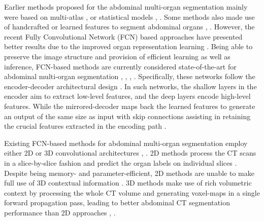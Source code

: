 \documentclass[final,5p,times,twocolumn]{elsarticle}
\begin{document}
Earlier methods proposed for the abdominal multi-organ segmentation mainly were based on multi-atlas \cite{xu2015efficient}, \cite{suzuki2012multi} or statistical models \cite{cerrolaza2015automatic}, \cite{okada2015abdominal}. Some methods also made use of handcrafted or learned features to segment abdominal organs \cite{campadelli2009automatic}, \cite{Selver2014SegmentationOA}. However, the recent Fully Convolutional Network (FCN) based approaches have presented better results due to the improved organ representation learning \cite{gibson2018automatic} \cite{heinrich2019obelisk}. Being able to preserve the image structure and provision of efficient learning as well as inference, FCN-based methods are currently considered state-of-the-art for abdominal multi-organ segmentation \cite{gibson2018automatic}, \cite{bobo2018fully}, \cite{sinha2020multi}, \cite{Lu2022}. Specifically, these networks follow the encoder-decoder architectural design \cite{ronneberger2015u}. In such networks, the shallow layers in the encoder aim to extract low-level features, and the deep layers encode high-level features. While the mirrored-decoder maps back the learned features to generate an output of the same size as input with skip connections assisting in retaining the crucial features extracted in the encoding path \cite{ronneberger2015u}.

Existing FCN-based methods for abdominal multi-organ segmentation employ either 2D or 3D convolutional architectures \cite{sinha2020multi}, \cite{bobo2018fully}. 2D methods process the CT scans in a slice-by-slice fashion and predict the organ labels on individual slices \cite{sinha2020multi}. Despite being memory- and parameter-efficient, 2D methods are unable to make full use of 3D contextual information \cite{gibson2018automatic}. 3D methods make use of rich volumetric context by processing the whole CT volume and generating voxel-maps in a single forward propagation pass, leading to better abdominal CT segmentation performance than 2D approaches \cite{Roth2018AnAO}, \cite{Zhou2018PerformanceEO}.
\end{document}
